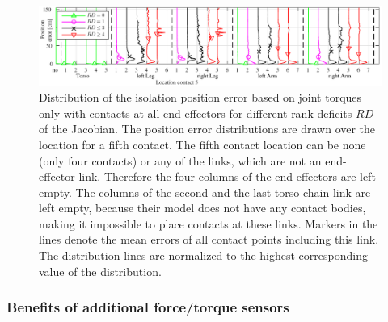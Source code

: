 \begin{figure}
\begin{center}
\includegraphics{figures/collest_multi_stat_manipcoll_error/error_rank_manipcoll_hist_breit}
\end{center}\vspace*{-0.4cm}
\caption{Distribution of the isolation position error based on joint torques only with contacts at all end-effectors for different rank deficits $RD$ of the Jacobian.
The position error distributions are drawn over the location for a fifth contact.
The fifth contact location can be none (only four contacts) or any of the links, which are not an end-effector link.
Therefore the four columns of the end-effectors are left empty.
The columns of the second and the last torso chain link are left empty, because their model does not have any contact bodies, making it impossible to place contacts at these links.
Markers in the lines denote the mean errors of all contact points including this link.
The distribution lines are normalized to the highest corresponding value of the distribution.}\vspace*{-0.7cm}
\label{fig:error_rank_manipcoll}
\end{figure}

\subsubsection{Benefits of additional force/torque sensors}

